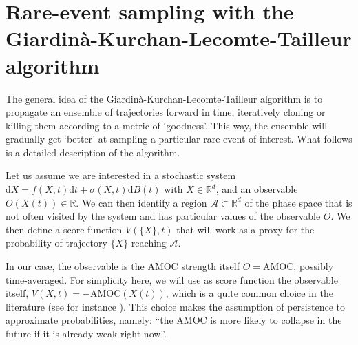 \section{Rare-event sampling with the Giardin\`a-Kurchan-Lecomte-Tailleur algorithm}\label{AppREA}

The general idea of the Giardin\`a-Kurchan-Lecomte-Tailleur algorithm is to propagate an ensemble of trajectories forward in time, iteratively cloning or killing them according to a metric of `goodness'. This way, the ensemble will gradually get `better' at sampling a particular rare event of interest. What follows is a detailed description of the algorithm.

Let us assume we are interested in a stochastic system $\text{d} X = f(X, t) \text{d} t + \sigma(X, t) \text{d} B(t)$ with $X \in \mathbb{R}^d$, and an observable $O(X(t)) \in \mathbb{R}$. We can then identify a region $\mathcal{A} \subset \mathbb{R}^d$ of the phase space that is not often visited by the system and has particular values of the observable $O$.
We then define a score function $V(\{X\}, t)$ that will work as a proxy for the probability of trajectory $\{X\}$ reaching $\mathcal{A}$.

In our case, the observable is the AMOC strength itself $O = \mathrm{AMOC}$, possibly time-averaged. For simplicity here, we will use as score function the observable itself, $V({X}, t) = -\mathrm{AMOC}(X(t))$, which is a quite common choice in the literature (see for instance \cite{GKTL-Ly,Ragone24}). This choice makes the assumption of persistence to approximate probabilities, namely: ``the AMOC is more likely to collapse in the future if it is already weak right now''.

